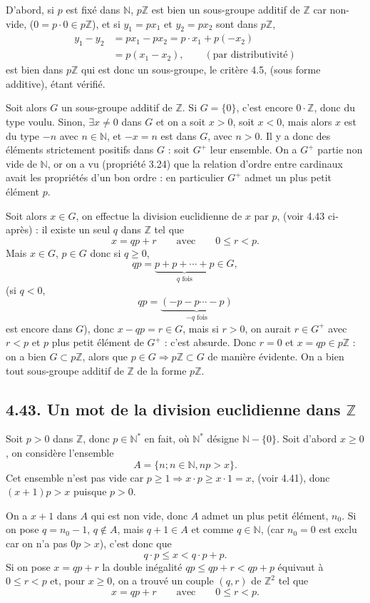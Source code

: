 D'abord, si $p$ est fixé dans $\mathbb N$, $p\mathbb Z$ est bien un sous-groupe additif de $\mathbb Z$ car non-vide, ($0=p\cdot0\in p\mathbb Z$), et si $y_1=px_1$ et $y_2=px_2$ sont dans $p\mathbb Z$,
\begin{align*}
y_1-y_2&=px_1-px_2=p\cdot x_1+p(-x_2)\\
&=p(x_1-x_2),\qquad(\text{par distributivité})
\end{align*}
est bien dans $p\mathbb Z$ qui est donc un sous-groupe, le critère 4.5, (sous forme additive), étant vérifié.

Soit alors $G$ un sous-groupe additif de $\mathbb Z$. Si $G=\{0\}$, c'est encore $0\cdot\mathbb Z$, donc du type voulu. Sinon, $\exists x\ne0$ dans $G$ et on a soit $x>0$, soit $x<0$, mais alors $x$ est du type $-n$ avec $n\in\mathbb N$, et $-x=n$ est dans $G$, avec $n>0$. Il y a donc des éléments strictement positifs dans $G$ : soit $G^+$ leur ensemble. On a $G^+$ partie non vide de $\mathbb N$, or on a vu (propriété 3.24) que la relation d'ordre entre cardinaux avait les propriétés d'un bon ordre : en particulier $G^+$ admet un plus petit élément $p$.

Soit alors $x\in G$, on effectue la division euclidienne de $x$ par $p$, (voir 4.43 ci-après) : il existe un seul $q$ dans $\mathbb Z$ tel que
\[
x=qp+r\qquad\text{avec}\qquad0\le r<p.
\]
Mais $x\in G$, $p\in G$ donc si $q\ge0$,
\[
qp=\underbrace{p+p+\cdots+p}_{q\text{ fois}}\in G,
\]
(si $q<0$,
\[
qp=\underbrace{(-p-p\cdots-p)}_{-q\text{ fois}}
\]
est encore dans $G$), donc $x-qp=r\in G$, mais si $r>0$, on aurait $r\in G^+$ avec $r<p$ et $p$ plus petit élément de $G^+$ : c'est absurde. Donc $r=0$ et $x=qp\in p\mathbb Z$ : on a bien $G\subset p\mathbb Z$, alors que $p\in G\Rightarrow p\mathbb Z\subset G$ de manière évidente. On a bien tout sous-groupe additif de $\mathbb Z$ de la forme $p\mathbb Z$. \bookend

\subsection*{4.43. Un mot de la division euclidienne dans $\mathbb Z$}
Soit $p>0$ dans $\mathbb Z$, donc $p\in\mathbb N^*$ en fait, où $\mathbb N^*$ désigne $\mathbb N-\{0\}$. Soit d'abord $x\ge0$, on considère l'ensemble
\[
A=\{n;n\in\mathbb N,np>x\}.
\]
Cet ensemble n'est pas vide car $p\ge1\Rightarrow x\cdot p\ge x\cdot1=x$, (voir 4.41), donc $(x+1)p>x$ puisque $p>0$.

On a $x+1$ dans $A$ qui est non vide, donc $A$ admet un plus petit élément, $n_0$. Si on pose $q=n_0-1$, $q\notin A$, mais $q+1\in A$ et comme $q\in\mathbb N$, (car $n_0=0$ est exclu car on n'a pas $0p>x$), c'est donc que
\[
q\cdot p\le x<q\cdot p+p.
\]
Si on pose $x=qp+r$ la double inégalité $qp\le qp+r<qp+p$ équivaut à $0\le r<p$ et, pour $x\ge0$, on a trouvé un couple $(q,r)$ de $\mathbb Z^2$ tel que
\[
x=qp+r\qquad\text{avec}\qquad0\le r<p.
\]

